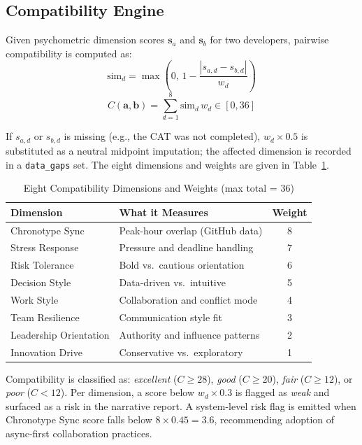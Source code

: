 \documentclass[conference]{IEEEtran}
\begin{document}
\subsection{Compatibility Engine}

Given psychometric dimension scores $\mathbf{s}_a$ and
$\mathbf{s}_b$ for two developers, pairwise compatibility is
computed as:
\begin{equation}
  \text{sim}_d = \max\!\left(0,\, 1 - \frac{|s_{a,d} - s_{b,d}|}{w_d}\right)
  \label{eq:sim}
\end{equation}
\begin{equation}
  C(\mathbf{a},\mathbf{b}) = \sum_{d=1}^{8} \text{sim}_d \, w_d \in [0, 36]
  \label{eq:compat}
\end{equation}

If $s_{a,d}$ or $s_{b,d}$ is missing (e.g., the CAT was not
completed), $w_d \times 0.5$ is substituted as a neutral midpoint
imputation; the affected dimension is recorded in a
\texttt{data\_gaps} set.  The eight dimensions and weights are
given in Table~\ref{tab:dims}.

\begin{table}[t]
\caption{Eight Compatibility Dimensions and Weights (max total = 36)}
\label{tab:dims}
\centering
\small
\setlength{\tabcolsep}{4pt}
\begin{tabular}{p{3.0cm}p{3.5cm}c}
\toprule
Dimension & What it Measures & Weight \\
\midrule
Chronotype Sync        & Peak-hour overlap (GitHub data)     & 8 \\
Stress Response        & Pressure and deadline handling      & 7 \\
Risk Tolerance         & Bold vs.\ cautious orientation      & 6 \\
Decision Style         & Data-driven vs.\ intuitive          & 5 \\
Work Style             & Collaboration and conflict mode     & 4 \\
Team Resilience        & Communication style fit             & 3 \\
Leadership Orientation & Authority and influence patterns    & 2 \\
Innovation Drive       & Conservative vs.\ exploratory       & 1 \\
\bottomrule
\end{tabular}
\end{table}

Compatibility is classified as: \textit{excellent} ($C \geq 28$),
\textit{good} ($C \geq 20$), \textit{fair} ($C \geq 12$), or
\textit{poor} ($C < 12$).  Per dimension, a score below
$w_d \times 0.3$ is flagged as \textit{weak} and surfaced as a
risk in the narrative report.  A system-level risk flag is emitted
when Chronotype Sync score falls below $8 \times 0.45 = 3.6$,
recommending adoption of async-first collaboration practices.
\end{document}
